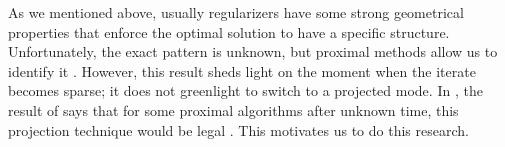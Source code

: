 As we mentioned above, usually regularizers have some strong geometrical properties that enforce the optimal solution to have a specific structure. Unfortunately, the exact pattern is unknown, but proximal methods allow us to identify it \cite{nutini2019active}. However, this result sheds light on the moment when the iterate becomes sparse; it does not greenlight to switch to a projected mode. In , the result of \cite{fadili2018sensitivity} says that for some proximal algorithms after unknown time, this projection technique would be legal . {This motivates us to do this research.}
